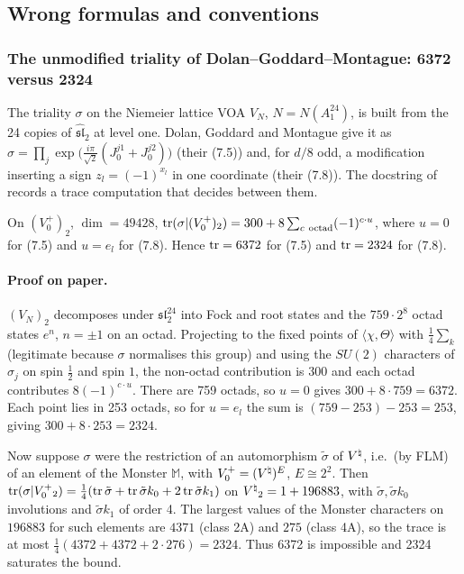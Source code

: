 \subsection{Wrong formulas and conventions}

\subsubsection{The unmodified triality of Dolan--Goddard--Montague: 6372 versus 2324}\label{ch15:sec:6372}

The triality $\sigma$ on the Niemeier lattice VOA $V_N$, $N=N(A_1^{24})$, is built from the 24
copies of $\widehat{\mathfrak{sl}}_2$ at level one. Dolan, Goddard and Montague give it as
$\sigma=\prod_j\exp\bigl(\tfrac{i\pi}{\sqrt2}(J_0^{j1}+J_0^{j2})\bigr)$ (their (7.5)) and, for
$d/8$ odd, a modification inserting a sign $z_l=(-1)^{x_l}$ in one coordinate (their (7.8)). The
docstring of  records a trace computation that decides
between them.

\begin{proposition}\label{ch15:prop:trace}
On $(V_0^+)_2$, $\dim=49428$,
$\tr(\sigma|(V_0^+)_2)=300+8\sum_{c\ \text{octad}}(-1)^{c\cdot u}$, where $u=0$ for (7.5) and
$u=e_l$ for (7.8). Hence $\operatorname{tr}=6372$ for (7.5) and $\operatorname{tr}=2324$ for (7.8).
\end{proposition}

\paragraph{Proof on paper.} $(V_N)_2$ decomposes under $\mathfrak{sl}_2^{24}$ into Fock and root
states and the $759\cdot2^8$ octad states $e^{n}$, $n=\pm1$ on an octad. Projecting to the fixed
points of $\langle\chi,\Theta\rangle$ with $\tfrac14\sum_{k}$ (legitimate because $\sigma$ normalises
this group) and using the $SU(2)$ characters of $\sigma_j$ on spin $\frac12$ and spin $1$, the
non-octad contribution is $300$ and each octad contributes $8(-1)^{c\cdot u}$. There are 759 octads,
so $u=0$ gives $300+8\cdot759=6372$. Each point lies in 253 octads, so for $u=e_l$ the sum is
$(759-253)-253=253$, giving $300+8\cdot253=2324$.

Now suppose $\sigma$ were the restriction of an automorphism $\tilde\sigma$ of ${V^{\natural}}$, i.e.\ (by
FLM) of an element of the Monster $\mathbb M$, with $V_0^+=({V^{\natural}})^E$, $E\cong2^2$. Then
$\operatorname{tr}(\sigma|V_0^+{}_2)=\frac14(\operatorname{tr}\tilde\sigma+\operatorname{tr}\tilde\sigma k_0+2\operatorname{tr}\tilde\sigma k_1)$ on
${V^{\natural}}_2=1+196883$, with $\tilde\sigma,\tilde\sigma k_0$ involutions and $\tilde\sigma k_1$ of order
4. The largest values of the Monster characters on $196883$ for such elements are $4371$ (class 2A)
and $275$ (class 4A), so the trace is at most $\frac14(4372+4372+2\cdot276)=2324$. Thus 6372 is
impossible and 2324 saturates the bound.


